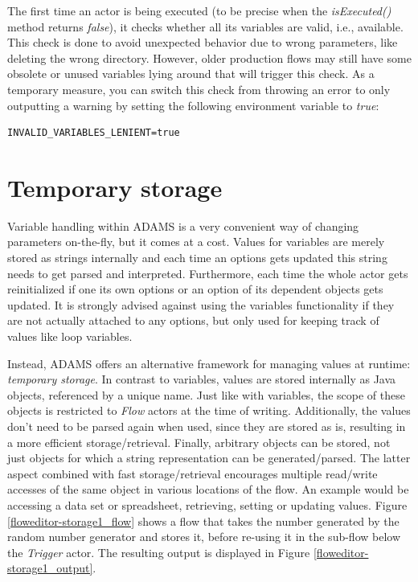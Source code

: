 The first time an actor is being executed (to be precise when the \textit{isExecuted()}
method returns \textit{false}), it checks whether all its variables are valid, i.e.,
available. This check is done to avoid unexpected behavior due to wrong parameters,
like deleting the wrong directory. However, older production flows may still
have some obsolete or unused variables lying around that will trigger this check.
As a temporary measure, you can switch this check from throwing an error to
only outputting a warning by setting the following environment variable to
\textit{true}:
\begin{verbatim}
INVALID_VARIABLES_LENIENT=true
\end{verbatim}

\clearpage
\section{Temporary storage}
\label{temporary_storage}
Variable handling within ADAMS is a very convenient way of changing parameters
on-the-fly, but it comes at a cost. Values for variables are merely stored as
strings internally and each time an options gets updated this string needs to
get parsed and interpreted. Furthermore, each time the whole actor gets
reinitialized if one its own options or an option of its dependent objects gets
updated. It is strongly advised against using the variables functionality if
they are not actually attached to any options, but only used for keeping track
of values like loop variables.

Instead, ADAMS offers an alternative framework for managing values at runtime:
\textit{temporary storage}. In contrast to variables, values are stored
internally as Java objects, referenced by a unique name. Just like with
variables, the scope of these objects is restricted to \textit{Flow} actors at
the time of writing. Additionally, the values don't need to be parsed again
when used, since they are stored as is, resulting in a more efficient
storage/retrieval. Finally, arbitrary objects can be stored, not just objects
for which a string representation can be generated/parsed. The latter aspect
combined with fast storage/retrieval encourages multiple read/write accesses of
the same object in various locations of the flow. An example would be accessing
a data set or spreadsheet, retrieving, setting or updating values. Figure
\ref{floweditor-storage1_flow} shows a flow that takes the number generated by
the random number generator and stores it, before re-using it in the sub-flow
below the \textit{Trigger} actor. The resulting output is displayed in Figure
\ref{floweditor-storage1_output}.

